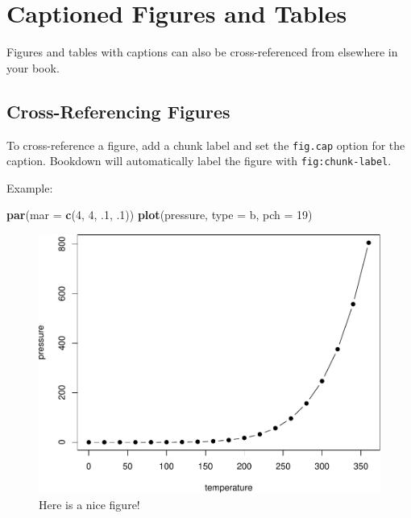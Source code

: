\documentclass[
]{book}
\newenvironment{Shaded}{\begin{snugshade}}{\end{snugshade}}
\newcommand{\AttributeTok}[1]{\textcolor[rgb]{0.13,0.29,0.53}{#1}}
\newcommand{\DecValTok}[1]{\textcolor[rgb]{0.00,0.00,0.81}{#1}}
\newcommand{\FunctionTok}[1]{\textcolor[rgb]{0.13,0.29,0.53}{\textbf{#1}}}
\newcommand{\NormalTok}[1]{#1}
\newcommand{\StringTok}[1]{\textcolor[rgb]{0.31,0.60,0.02}{#1}}
\theoremstyle{definition}
\theoremstyle{definition}
\theoremstyle{definition}
\theoremstyle{definition}
\theoremstyle{remark}
\begin{document}
\section{Captioned Figures and Tables}\label{captioned-figures-and-tables}

Figures and tables with captions can also be cross-referenced from elsewhere in your book.

\subsection{Cross-Referencing Figures}\label{cross-referencing-figures-1}

To cross-reference a figure, add a chunk label and set the \texttt{fig.cap} option for the caption. Bookdown will automatically label the figure with \texttt{fig:chunk-label}.

Example:

\begin{Shaded}
\begin{Highlighting}[]
\FunctionTok{par}\NormalTok{(}\AttributeTok{mar =} \FunctionTok{c}\NormalTok{(}\DecValTok{4}\NormalTok{, }\DecValTok{4}\NormalTok{, .}\DecValTok{1}\NormalTok{, .}\DecValTok{1}\NormalTok{))}
\FunctionTok{plot}\NormalTok{(pressure, }\AttributeTok{type =} \StringTok{\textquotesingle{}b\textquotesingle{}}\NormalTok{, }\AttributeTok{pch =} \DecValTok{19}\NormalTok{)}
\end{Highlighting}
\end{Shaded}

\begin{figure}

{\centering \includegraphics[width=0.8\linewidth]{_main_files/figure-latex/nice-fig-1} 

}

\caption{Here is a nice figure!}\label{fig:nice-fig}
\end{figure}
\end{document}
